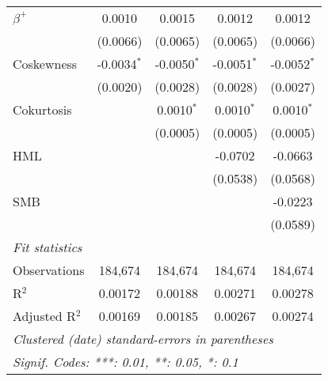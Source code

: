 \begin{table}[H]
\begin{tabular}{lcccc}
      $\beta^{+}$    & 0.0010         & 0.0015         & 0.0012        & 0.0012\\   
                     & (0.0066)       & (0.0065)       & (0.0065)      & (0.0066)\\   
      Coskewness     & -0.0034$^{*}$  & -0.0050$^{*}$  & -0.0051$^{*}$ & -0.0052$^{*}$\\   
                     & (0.0020)       & (0.0028)       & (0.0028)      & (0.0027)\\   
      Cokurtosis     &                & 0.0010$^{*}$   & 0.0010$^{*}$  & 0.0010$^{*}$\\   
                     &                & (0.0005)       & (0.0005)      & (0.0005)\\   
      HML            &                &                & -0.0702       & -0.0663\\   
                     &                &                & (0.0538)      & (0.0568)\\   
      SMB            &                &                &               & -0.0223\\   
                     &                &                &               & (0.0589)\\   
      \midrule
      \emph{Fit statistics}\\
      Observations   & 184,674        & 184,674        & 184,674       & 184,674\\  
      R$^2$          & 0.00172        & 0.00188        & 0.00271       & 0.00278\\  
      Adjusted R$^2$ & 0.00169        & 0.00185        & 0.00267       & 0.00274\\  
      \midrule \midrule
      \multicolumn{5}{l}{\emph{Clustered (date) standard-errors in parentheses}}\\
      \multicolumn{5}{l}{\emph{Signif. Codes: ***: 0.01, **: 0.05, *: 0.1}}\\
   \end{tabular}
\end{table}
